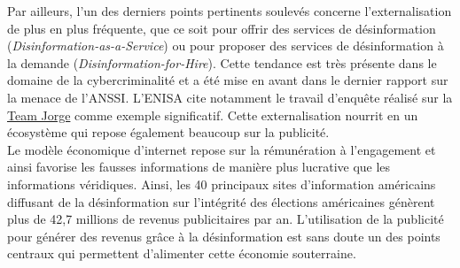 \documentclass[a4paper]{article}
\begin{document}
Par ailleurs, l'un des derniers points pertinents soulevés concerne l'externalisation de plus en plus fréquente, que ce soit pour offrir des services de désinformation (\textit{Disinformation-as-a-Service}) ou pour proposer des services de désinformation à la demande (\textit{Disinformation-for-Hire}). Cette tendance est très présente dans le domaine de la cybercriminalité et a été mise en avant dans le dernier rapport sur la menace de l'ANSSI. L'ENISA cite notamment le travail d'enquête réalisé sur la \href{https://www.theguardian.com/world/2023/feb/15/aims-software-avatars-team-jorge-disinformation-fake-profiles}{Team Jorge} comme exemple significatif. 
Cette externalisation nourrit en un écosystème qui repose également beaucoup sur la publicité.
\\


Le modèle économique d’internet repose sur la rémunération à l’engagement et ainsi favorise les fausses informations de manière plus lucrative que les informations véridiques. Ainsi, les 40 principaux sites d’information américains diffusant de la désinformation sur l’intégrité des élections américaines génèrent plus de 42,7 millions de revenus publicitaires par an. L’utilisation de la publicité pour générer des revenus grâce à la désinformation est sans doute un des points centraux qui permettent d’alimenter cette économie souterraine.
\end{document}
